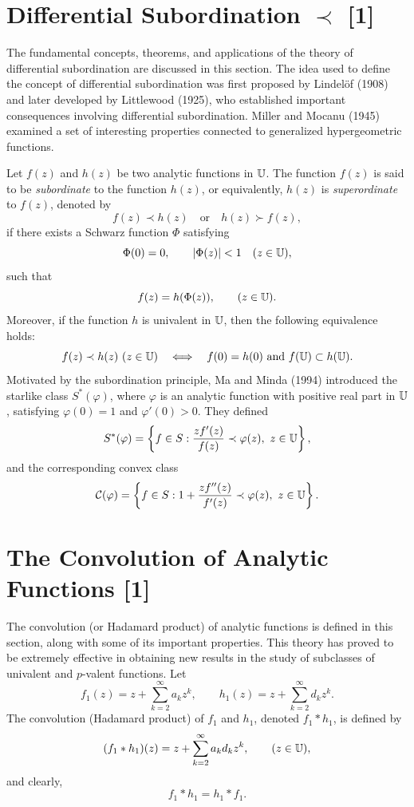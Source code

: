 \section[Differential Subordination $\prec$]{Differential Subordination $\prec$ [1]}

The fundamental concepts, theorems, and applications of the theory of differential subordination are discussed in this section. The idea used to define the concept of differential subordination was first proposed by Lindelöf (1908) and later developed by Littlewood (1925), who established important consequences involving differential subordination. Miller and Mocanu (1945) examined a set of interesting properties connected to generalized hypergeometric functions.

Let $f(z)$ and $h(z)$ be two analytic functions in $\mathbb{U}$. The function $f(z)$ is said to be \emph{subordinate} to the function $h(z)$, or equivalently, $h(z)$ is \emph{superordinate} to $f(z)$, denoted by
\[
f(z) \prec h(z) \quad \text{or} \quad h(z) \succ f(z),
\]
if there exists a Schwarz function $\Phi$ satisfying
\[
\Phi(0) = 0, \qquad |\Phi(z)| < 1 \quad (z \in \mathbb{U}),
\]
such that
\[
f(z) = h(\Phi(z)), \qquad (z \in \mathbb{U}).
\]
Moreover, if the function $h$ is univalent in $\mathbb{U}$, then the following equivalence holds:
\[
f(z) \prec h(z) \ (z \in \mathbb{U})
\quad \Longleftrightarrow \quad
f(0) = h(0) \ \text{and} \ f(\mathbb{U}) \subset h(\mathbb{U}).
\]
Motivated by the subordination principle, Ma and Minda (1994) introduced the starlike class $S^{*}(\varphi)$, where $\varphi$ is an analytic function with positive real part in $\mathbb{U}$, satisfying $\varphi(0) = 1$ and $\varphi'(0) > 0$. They defined
\[
S^{*}(\varphi) = \left\{ f \in S : \frac{z f'(z)}{f(z)} \prec \varphi(z), \ z \in \mathbb{U} \right\},
\]
and the corresponding convex class
\[
\mathcal{C}(\varphi) = \left\{ f \in S : 1 + \frac{z f''(z)}{f'(z)} \prec \varphi(z), \ z \in \mathbb{U} \right\}.
\]

\section[The Convolution of Analytic Functions]{The Convolution of Analytic Functions [1]}

The convolution (or Hadamard product) of analytic functions is defined in this section, along with some of its important properties. This theory has proved to be extremely effective in obtaining new results in the study of subclasses of univalent and $p$-valent functions.
Let
\[
f_1(z) = z + \sum_{k=2}^{\infty} a_k z^k, 
\qquad
h_1(z) = z + \sum_{k=2}^{\infty} d_k z^k.
\]
The convolution (Hadamard product) of $f_1$ and $h_1$, denoted $f_1 * h_1$, is defined by
\[
(f_1 * h_1)(z) = z + \sum_{k=2}^{\infty} a_k d_k z^k, \qquad (z \in \mathbb{U}),
\]
and clearly,
\[
f_1 * h_1 = h_1 * f_1.
\]


